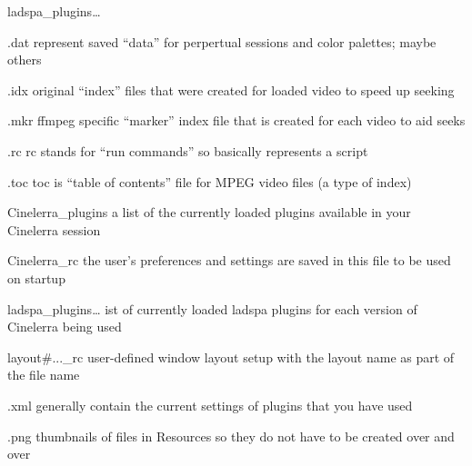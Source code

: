 \begin{labeling}{ladspa\_plugins{\dots}}
	\item [.dat] represent saved ``data'' for perpertual sessions and color palettes; maybe others
	\item [.idx] original ``index'' files that were created for loaded video to speed up seeking
	\item [.mkr] ffmpeg specific ``marker'' index file that is created for each video to aid seeks
	\item [.rc] rc stands for ``run commands'' so basically represents a script
	\item [.toc] toc is ``table of contents'' file for MPEG video files (a type of index)
	\item [Cinelerra\_plugins] a list of the currently loaded plugins available in your Cinelerra session
	\item [Cinelerra\_rc] the user's preferences and settings are saved in this file to be used on startup
	\item [ladspa\_plugins{\dots}] ist of currently loaded ladspa plugins for each version of Cinelerra being used
	\item [layout\#...\_rc] user-defined window layout setup with the layout name as part of the file name
	\item [.xml] generally contain the current settings of plugins that you have used
	\item [.png] thumbnails of files in Resources so they do not have to be created over and over
\end{labeling}

